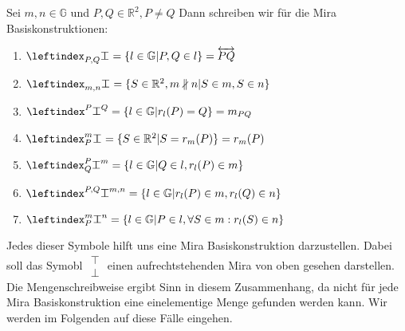 \begin{notation}
    \label{not:mira}
    Sei $m,n \in \mathbb{G}$ und $P,Q \in \mathbb{R}^2, P \neq Q$
    Dann schreiben wir für die Mira Basiskonstruktionen:
    \begin{enumerate}[label=\roman*.]
        \item $ \mira{P,Q}{}{} = \{l \in \mathbb{G} | P,Q \in l\} = \overleftrightarrow{PQ} $
        \item $ \mira{m,n}{}{} = \{S \in \mathbb{R}^2, m \nparallel n | S \in m, S \in n\} $
        \item $ \mira{}{P}{Q} = \{l \in \mathbb{G} |  r_l(P) = Q\} = m_{PQ} $
        \item $ \mira{P}{m}{} = \{S \in \mathbb{R}^2 | S = r_m(P)\} = r_m(P) $
        \item $ \mira{Q}{P}{m} = \{l \in \mathbb{G} |  Q \in l, r_l(P) \in m\} $
        \item $ \mira{}{P,Q}{m,n} = \{l \in \mathbb{G} |  r_l(P) \in m, r_l(Q) \in n\} $
        \item $ \mira{P}{m}{n} = \{l \in \mathbb{G} |  P \in l, \forall S \in m: r_l(S) \in n\} $
    \end{enumerate}
\end{notation}

\begin{note}
    Jedes dieser Symbole hilft uns eine Mira Basiskonstruktion darzustellen. Dabei soll das Symobl $ \mathrel{\substack{\top\\\bot}} $ einen aufrechtstehenden Mira von oben gesehen darstellen.
    Die Mengenschreibweise ergibt Sinn in diesem Zusammenhang, da nicht für jede Mira Basiskonstruktion eine einelementige Menge gefunden werden kann. Wir werden im Folgenden auf diese Fälle eingehen.
\end{note}